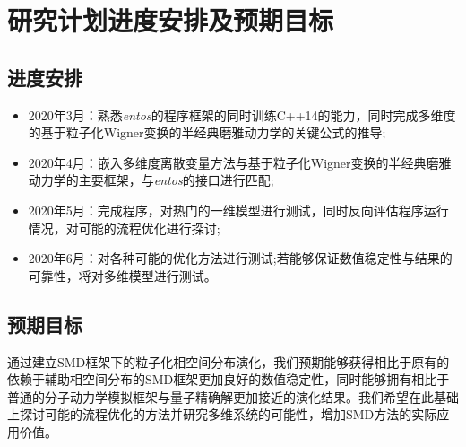 \section{研究计划进度安排及预期目标}

\subsection{进度安排}
\begin{itemize}
	\item 2020年3月：熟悉\emph{entos}的程序框架的同时训练C++14的能力，同时完成多维度的基于粒子化Wigner变换的半经典磨雅动力学的关键公式的推导;
	\item 2020年4月：嵌入多维度离散变量方法与基于粒子化Wigner变换的半经典磨雅动力学的主要框架，与\emph{entos}的接口进行匹配;
	\item 2020年5月：完成程序，对热门的一维模型进行测试，同时反向评估程序运行情况，对可能的流程优化进行探讨;
	\item 2020年6月：对各种可能的优化方法进行测试;若能够保证数值稳定性与结果的可靠性，将对多维模型进行测试。
\end{itemize}


\subsection{预期目标}
通过建立SMD框架下的粒子化相空间分布演化，我们预期能够获得相比于原有的依赖于辅助相空间分布的SMD框架更加良好的数值稳定性，同时能够拥有相比于普通的分子动力学模拟框架与量子精确解更加接近的演化结果。我们希望在此基础上探讨可能的流程优化的方法并研究多维系统的可能性，增加SMD方法的实际应用价值。